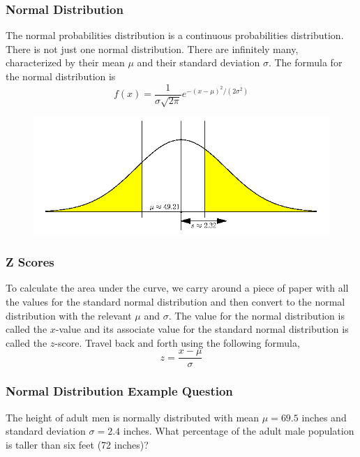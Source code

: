 \documentclass[xcolor=dvipsnames]{beamer}
\begin{document}
\begin{frame}
  \frametitle{Normal Distribution}
  The normal probabilities distribution is a \alert{continuous}
  probabilities distribution. There is not just one normal
  distribution. There are infinitely many, characterized by their
  \alert{mean $\mu$} and their \alert{standard deviation $\sigma$}.
  The formula for the normal distribution is
  \begin{equation}
    \label{eq:aengeeph}
    f(x)=\frac{1}{\sigma\sqrt{2\pi}}e^{-(x-\mu)^{2}/(2\sigma^{2})}
  \end{equation}
  \begin{figure}[h]
    \includegraphics[scale=.4]{./diagrams/qfour.png}
  \end{figure}
\end{frame}

\begin{frame}
  \frametitle{Z Scores}
  To calculate the area under the curve, we carry around a piece of
  paper with all the values for the \alert{standard normal
    distribution} and then convert to the normal distribution with the
  relevant $\mu$ and $\sigma$. The value for the normal distribution
  is called the \alert{$x$-value} and its associate value for the
  standard normal distribution is called the \alert{$z$-score}. Travel
  back and forth using the following formula,
  \begin{equation}
    \label{eq:uotoogoo}
    z=\frac{x-\mu}{\sigma}
  \end{equation}
\end{frame}

\begin{frame}
  \frametitle{Normal Distribution Example Question}
   The height of adult men is normally
  distributed with mean $\mu=69.5$ inches and standard deviation
  $\sigma=2.4$ inches. What percentage of the adult male population is
  taller than six feet (72 inches)? 
\end{frame}
\end{document}
